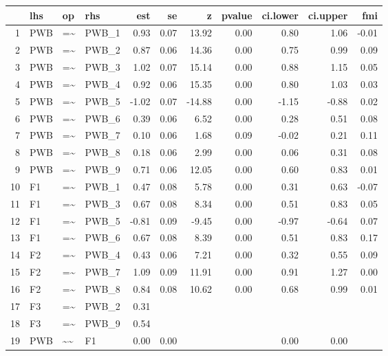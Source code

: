 \documentclass{article}
\begin{document}



\begin{table}[ht]
\centering
\begin{tabular}{rlllrrrrrrr}
  \hline
 & lhs & op & rhs & est & se & z & pvalue & ci.lower & ci.upper & fmi \\ 
  \hline
1 & PWB & =\~{} & PWB\_1 & 0.93 & 0.07 & 13.92 & 0.00 & 0.80 & 1.06 & -0.01 \\ 
  2 & PWB & =\~{} & PWB\_2 & 0.87 & 0.06 & 14.36 & 0.00 & 0.75 & 0.99 & 0.09 \\ 
  3 & PWB & =\~{} & PWB\_3 & 1.02 & 0.07 & 15.14 & 0.00 & 0.88 & 1.15 & 0.05 \\ 
  4 & PWB & =\~{} & PWB\_4 & 0.92 & 0.06 & 15.35 & 0.00 & 0.80 & 1.03 & 0.03 \\ 
  5 & PWB & =\~{} & PWB\_5 & -1.02 & 0.07 & -14.88 & 0.00 & -1.15 & -0.88 & 0.02 \\ 
  6 & PWB & =\~{} & PWB\_6 & 0.39 & 0.06 & 6.52 & 0.00 & 0.28 & 0.51 & 0.08 \\ 
  7 & PWB & =\~{} & PWB\_7 & 0.10 & 0.06 & 1.68 & 0.09 & -0.02 & 0.21 & 0.11 \\ 
  8 & PWB & =\~{} & PWB\_8 & 0.18 & 0.06 & 2.99 & 0.00 & 0.06 & 0.31 & 0.08 \\ 
  9 & PWB & =\~{} & PWB\_9 & 0.71 & 0.06 & 12.05 & 0.00 & 0.60 & 0.83 & 0.01 \\ 
  10 & F1 & =\~{} & PWB\_1 & 0.47 & 0.08 & 5.78 & 0.00 & 0.31 & 0.63 & -0.07 \\ 
  11 & F1 & =\~{} & PWB\_3 & 0.67 & 0.08 & 8.34 & 0.00 & 0.51 & 0.83 & 0.05 \\ 
  12 & F1 & =\~{} & PWB\_5 & -0.81 & 0.09 & -9.45 & 0.00 & -0.97 & -0.64 & 0.07 \\ 
  13 & F1 & =\~{} & PWB\_6 & 0.67 & 0.08 & 8.39 & 0.00 & 0.51 & 0.83 & 0.17 \\ 
  14 & F2 & =\~{} & PWB\_4 & 0.43 & 0.06 & 7.21 & 0.00 & 0.32 & 0.55 & 0.09 \\ 
  15 & F2 & =\~{} & PWB\_7 & 1.09 & 0.09 & 11.91 & 0.00 & 0.91 & 1.27 & 0.00 \\ 
  16 & F2 & =\~{} & PWB\_8 & 0.84 & 0.08 & 10.62 & 0.00 & 0.68 & 0.99 & 0.01 \\ 
  17 & F3 & =\~{} & PWB\_2 & 0.31 &  &  &  &  &  &  \\ 
  18 & F3 & =\~{} & PWB\_9 & 0.54 &  &  &  &  &  &  \\ 
  19 & PWB & \~{}\~{} & F1 & 0.00 & 0.00 &  &  & 0.00 & 0.00 &  \\ 

\end{tabular}
\end{table}
\end{document}
